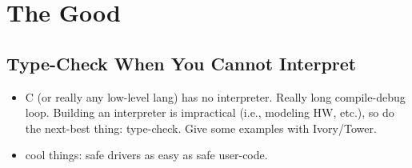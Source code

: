 \section{The Good}

\subsection{Type-Check When You Cannot Interpret}

\begin{itemize}
  \item C (or really any low-level lang) has no interpreter.  Really long
  compile-debug loop.  Building an interpreter is impractical (i.e., modeling
  HW, etc.), so do the next-best thing: type-check.  Give some examples with
  Ivory/Tower.

  \item cool things: safe drivers as easy as safe user-code.
\end{itemize}


